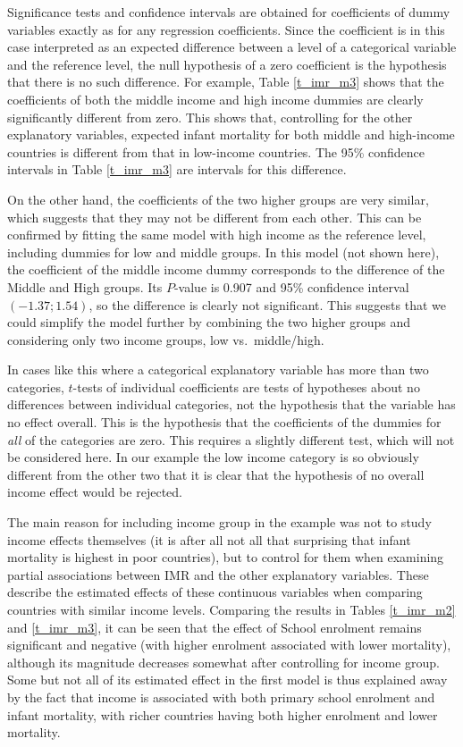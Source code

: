 Significance tests and confidence intervals are obtained for
coefficients of dummy variables exactly as for any regression
coefficients. Since the coefficient is in this case interpreted as an
expected difference between a level of a categorical variable and the
reference level, the null hypothesis of a zero coefficient is the
hypothesis that there is no such difference. For example, Table
\ref{t_imr_m3} shows that the coefficients of both the middle income and
high income dummies are clearly significantly different from zero. This
shows that, controlling for the other explanatory variables, expected
infant mortality for both middle and high-income countries is different
from that in low-income countries. The 95\% confidence intervals in
Table \ref{t_imr_m3} are intervals for this difference.

On the other hand, the coefficients of the two higher groups are
very similar, which suggests that they may not be different from each
other. This can be confirmed by fitting the same model with high income
as the reference level, including dummies for low and middle groups. In
this model (not shown here), the coefficient of the middle income dummy
corresponds to the difference of the Middle and High groups. Its
$P$-value is 0.907 and 95\% confidence interval $(-1.37; 1.54)$,
so the difference is clearly not significant. This suggests that we
could simplify the model further by combining the two higher groups and
considering only two income groups, low vs.\ middle/high.

In cases like this where a categorical explanatory variable has more
than two categories, $t$-tests of individual coefficients are tests of
hypotheses about no differences between individual categories, not the
hypothesis that the variable has no effect overall. This is the
hypothesis that the coefficients of the dummies for \emph{all} of the
categories are zero. This requires a slightly different test, which will
not be considered here. In our example the low income category is so
obviously different from the other two that it is clear that the
hypothesis of no overall income effect would be rejected.

The main reason for including income group in the example
was not to study income effects themselves (it is after all not all
that surprising that infant mortality is highest in poor countries), but
to control for them when examining partial associations between IMR and
the other explanatory variables. These describe the estimated effects of
these continuous variables when comparing countries with similar income
levels. Comparing the results in Tables \ref{t_imr_m2} and
\ref{t_imr_m3}, it can be seen that the effect of School enrolment
remains significant and negative (with higher enrolment associated with
lower mortality), although its magnitude decreases somewhat after
controlling for income group. Some but not all of its estimated effect
in the first model is thus explained away by the fact that income is
associated with both primary school enrolment and infant mortality, with
richer countries having both higher enrolment and lower mortality.

